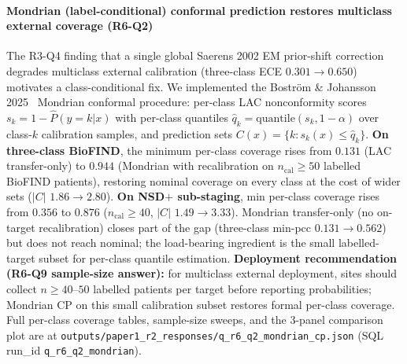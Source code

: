 \paragraph*{Mondrian (label-conditional) conformal prediction restores multiclass external coverage (R6-Q2)} The R3-Q4 finding that a single global Saerens 2002 EM prior-shift correction degrades multiclass external calibration (three-class ECE $0.301 \rightarrow 0.650$) motivates a class-conditional fix. We implemented the Bostr\"{o}m \& Johansson 2025~\cite{bostrom2025mondrian} Mondrian conformal procedure: per-class LAC nonconformity scores $s_k = 1 - \hat{P}(y{=}k|x)$ with per-class quantiles $\hat{q}_k = \mathrm{quantile}(s_k, 1{-}\alpha)$ over class-$k$ calibration samples, and prediction sets $C(x) = \{k : s_k(x) \leq \hat{q}_k\}$. \textbf{On three-class BioFIND}, the minimum per-class coverage rises from $0.131$ (LAC transfer-only) to $\mathbf{0.944}$ (Mondrian with recalibration on $n_{\mathrm{cal}}{\geq}50$ labelled BioFIND patients), restoring nominal coverage on every class at the cost of wider sets ($|C|$ $1.86 \to 2.80$). \textbf{On NSD$+$ sub-staging}, min per-class coverage rises from $0.356$ to $\mathbf{0.876}$ ($n_{\mathrm{cal}}{\geq}40$, $|C|$ $1.49 \to 3.33$). Mondrian transfer-only (no on-target recalibration) closes part of the gap (three-class min-pcc $0.131 \to 0.562$) but does not reach nominal; the load-bearing ingredient is the small labelled-target subset for per-class quantile estimation. \textbf{Deployment recommendation (R6-Q9 sample-size answer):} for multiclass external deployment, sites should collect $n{\geq}40$--$50$ labelled patients per target before reporting probabilities; Mondrian CP on this small calibration subset restores formal per-class coverage. Full per-class coverage tables, sample-size sweeps, and the 3-panel comparison plot are at \texttt{outputs/paper1\_r2\_responses/q\_r6\_q2\_mondrian\_cp.json} (SQL run\_id \texttt{q\_r6\_q2\_mondrian}).

